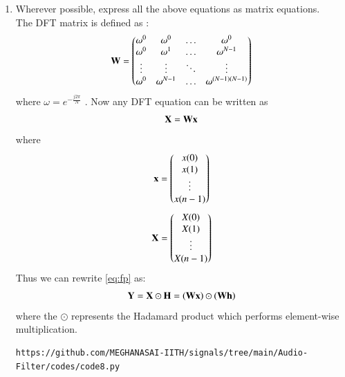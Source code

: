 \documentclass[journal,12pt,twocolumn]{IEEEtran}
\theoremstyle{remark}
\begin{document}
\begin{enumerate}[label=\thesection.\arabic*,ref=\thesection.\theenumi]
\item Wherever possible, express all the above equations as matrix equations.\\
\solution The DFT matrix is defined as : 
\begin{align}
	\mathbf{W} = 
	\begin{pmatrix}
		\omega^0 & \omega^0 & \ldots & \omega^0 \\
		\omega^0 & \omega^1 & \ldots & \omega^{N - 1} \\
		\vdots & \vdots & \ddots & \vdots \\
		\omega^0 & \omega^{N - 1} & \ldots & \omega^{(N -1)(N - 1)}
	\end{pmatrix}
\end{align}
where $\omega=e^{-\frac{j2\pi}{N}}$ . Now any DFT equation can be written as
\begin{align}
    \mathbf{X} = \mathbf{W}\mathbf{x}
\end{align}
\noindent where
\begin{align}
	\mathbf{x} = 
	\begin{pmatrix}
		x(0) \\ x(1) \\ \vdots \\ x(n - 1)
	\end{pmatrix}
\end{align}
\begin{align}
	\mathbf{X} = 
	\begin{pmatrix}
		X(0) \\ X(1) \\ \vdots \\ X(n - 1)
	\end{pmatrix}
\end{align}
Thus we can rewrite  \eqref{eq:fp} as:
\begin{align}
	\mathbf{Y} = \mathbf{X}\odot\mathbf{H} = \left(\mathbf{W}\mathbf{x}\right)\odot\left(\mathbf{W}\mathbf{h}\right)
\end{align}
where the $\odot$ represents the Hadamard product which performs element-wise multiplication.
\begin{lstlisting}
https://github.com/MEGHANASAI-IITH/signals/tree/main/Audio-Filter/codes/code8.py
\end{lstlisting}
\begin{figure}[H]
\centering

\end{figure}
\end{enumerate}
\end{document}
